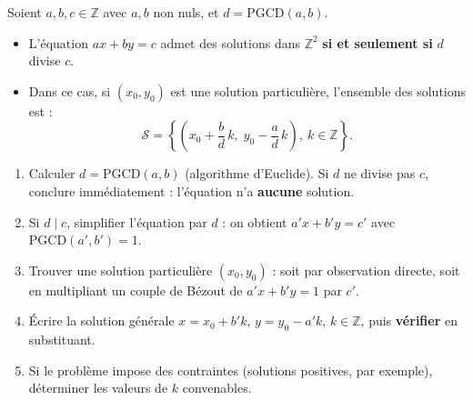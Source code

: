 \documentclass[11pt]{article}
\begin{document}
\begin{propriete}
Soient $a, b, c \in \mathbb{Z}$ avec $a, b$ non nuls, et $d = \mathrm{PGCD}(a,b)$.
\begin{itemize}
\item L'équation $ax + by = c$ admet des solutions dans $\mathbb{Z}^2$ \textbf{si et seulement si} $d$ divise $c$.
\item Dans ce cas, si $(x_0, y_0)$ est une solution particulière, l'ensemble des solutions est :
\[ \mathcal{S} = \left\{ \left( x_0 + \dfrac{b}{d}\,k,\; y_0 - \dfrac{a}{d}\,k \right),\ k \in \mathbb{Z} \right\}. \]
\end{itemize}
\end{propriete}

\begin{methode}[Résolution complète de $ax + by = c$]
\begin{enumerate}
\item Calculer $d = \mathrm{PGCD}(a,b)$ (algorithme d'Euclide). Si $d$ ne divise pas $c$, conclure immédiatement : l'équation n'a \textbf{aucune} solution.
\item Si $d \mid c$, simplifier l'équation par $d$ : on obtient $a'x + b'y = c'$ avec $\mathrm{PGCD}(a',b') = 1$.
\item Trouver une solution particulière $(x_0, y_0)$ : soit par observation directe, soit en multipliant un couple de Bézout de $a'x + b'y = 1$ par $c'$.
\item Écrire la solution générale $x = x_0 + b'k$, $y = y_0 - a'k$, $k \in \mathbb{Z}$, puis \textbf{vérifier} en substituant.
\item Si le problème impose des contraintes (solutions positives, par exemple), déterminer les valeurs de $k$ convenables.
\end{enumerate}
\end{methode}
\end{document}
